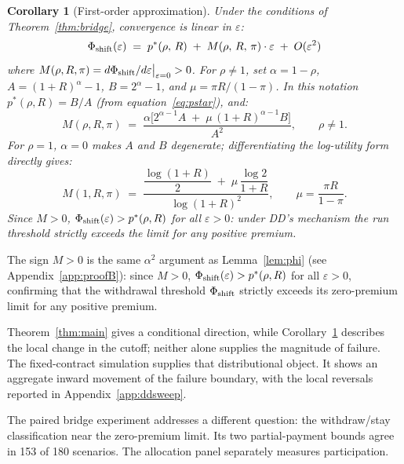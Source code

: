 \documentclass[12pt]{article}\usepackage[]{graphicx}\usepackage[]{xcolor}
\newtheorem{corollary}{Corollary}
\begin{document}
\begin{corollary}[First-order approximation]
\label{cor:approx}
Under the conditions of Theorem~\ref{thm:bridge}, convergence is linear in $\varepsilon$:
\begin{equation}
  \Phi_{\rm shift}(\varepsilon)
  \;=\; p^*(\rho,\,R)
        \;+\; M(\rho,\,R,\,\pi)\cdot\varepsilon
        \;+\; O(\varepsilon^2)
  \label{eq:approx}
\end{equation}
where $M(\rho,R,\pi) = d\Phi_{\rm shift}/d\varepsilon\big|_{\varepsilon=0} > 0$.
For $\rho \neq 1$, set $\alpha = 1-\rho$, $A = (1+R)^\alpha - 1$, $B = 2^\alpha - 1$, and $\mu = \pi R/(1-\pi)$.
In this notation $p^*(\rho,R) = B/A$ (from equation~\eqref{eq:pstar}), and:
\begin{equation}
  M(\rho,R,\pi) \;=\;
  \frac{\alpha\bigl[2^{\alpha-1}A \;+\; \mu\,(1+R)^{\alpha-1}B\bigr]}
       {A^2},
  \qquad \rho \neq 1.
  \label{eq:Mformula}
\end{equation}
For $\rho = 1$, $\alpha = 0$ makes $A$ and $B$ degenerate; differentiating the log-utility form directly gives:
\begin{equation}
  M(1,R,\pi) \;=\;
  \frac{\dfrac{\log(1+R)}{2} \;+\; \mu\,\dfrac{\log 2}{1+R}}
       {\log(1+R)^2},
  \qquad \mu = \frac{\pi R}{1-\pi}.
  \label{eq:Mformula_log}
\end{equation}
Since $M > 0$, $\Phi_{\rm shift}(\varepsilon) > p^*(\rho,R)$ for all $\varepsilon > 0$: under DD's mechanism the run threshold strictly exceeds the limit for any positive premium.
\end{corollary}

The sign $M > 0$ is the same $\alpha^2$ argument as Lemma~\ref{lem:phi} (see Appendix~\ref{app:proofB}): since $M > 0$, $\Phi_{\rm shift}(\varepsilon) > p^*(\rho,R)$ for all $\varepsilon > 0$, confirming that the withdrawal threshold $\Phi_{\rm shift}$ strictly exceeds its zero-premium limit for any positive premium.

Theorem~\ref{thm:main} gives a conditional direction, while Corollary~\ref{cor:approx} describes the local change in the cutoff; neither alone supplies the magnitude of failure.
The fixed-contract simulation supplies that distributional object.
It shows an aggregate inward movement of the failure boundary, with the local reversals reported in Appendix~\ref{app:ddsweep}.

The paired bridge experiment addresses a different question: the withdraw/stay classification near the zero-premium limit.
Its two partial-payment bounds agree in 153 of 180 scenarios.
The allocation panel separately measures participation.
\end{document}
